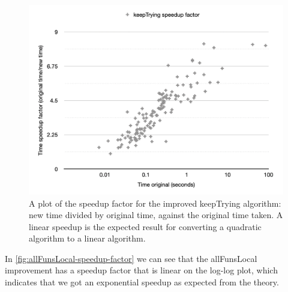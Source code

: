 \begin{figure}
    \centering
    \includegraphics[scale=0.5]{thesis/figure/keepTrying-speedup-factor.png}
    \caption{A plot of the speedup factor for the improved keepTrying algorithm: new time divided by original time, against the original time taken. A linear speedup is the expected result for converting a quadratic algorithm to a linear algorithm.}
    \label{fig:keepTrying-speedup-factor}
\end{figure}

In \autoref{fig:allFunsLocal-speedup-factor} we can see that the allFunsLocal improvement has a speedup factor that is linear on the log-log plot, which indicates that we got an exponential speedup as expected from the theory.

